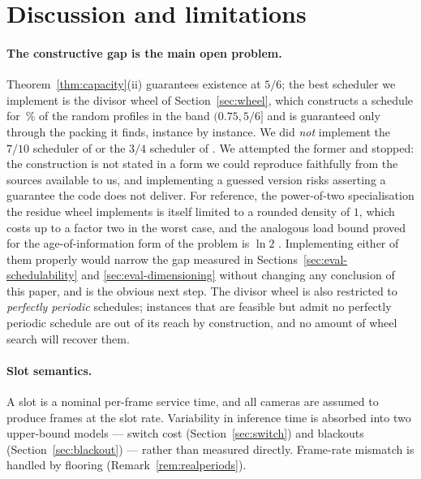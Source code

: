 \documentclass[final,5p,times,twocolumn]{elsarticle}
\theoremstyle{definition}
\begin{document}
\section{Discussion and limitations}\label{sec:limitations}

\paragraph{The constructive gap is the main open problem.} Theorem~\ref{thm:capacity}(ii)
guarantees existence at $5/6$; the best scheduler we implement is the divisor wheel of
Section~\ref{sec:wheel}, which constructs a schedule for \numEoneWheelEightPct\,\% of the random
profiles in the band $(0.75,5/6]$ and is guaranteed only through the packing it finds, instance by
instance. We did \emph{not} implement the $7/10$ scheduler of \cite{chanchin1993schedulers} or the
$3/4$ scheduler of \cite{fishburn2002densities}. We attempted the former and stopped: the
construction is not stated in a form we could reproduce faithfully from the sources available to
us, and implementing a guessed version risks asserting a guarantee the code does not deliver.
For reference, the power-of-two specialisation the residue wheel implements is itself limited to
a rounded density of $1$, which costs up to a factor two in the worst case, and the analogous
load bound proved for the age-of-information form of the problem is $\ln 2$
\cite{li2020aoi}.
Implementing either of them properly would narrow the gap measured in
Sections~\ref{sec:eval-schedulability} and \ref{sec:eval-dimensioning} without changing any
conclusion of this paper, and is the obvious next step. The divisor wheel is also restricted to
\emph{perfectly periodic} schedules; instances that are feasible but admit no perfectly periodic
schedule are out of its reach by construction, and no amount of wheel search will recover them.

\paragraph{Slot semantics.} A slot is a nominal per-frame service time, and all cameras are
assumed to produce frames at the slot rate. Variability in inference time is absorbed into two
upper-bound models --- switch cost (Section~\ref{sec:switch}) and blackouts
(Section~\ref{sec:blackout}) --- rather than measured directly. Frame-rate mismatch is handled by
flooring (Remark~\ref{rem:realperiods}).
\end{document}

